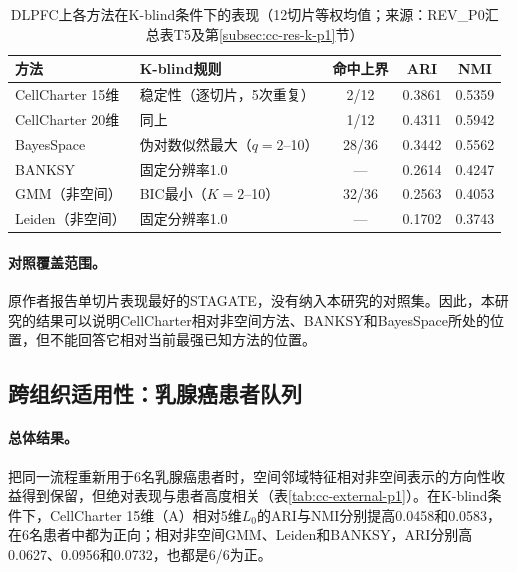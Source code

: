 \begin{table}[htbp]
\centering
\caption{DLPFC上各方法在K-blind条件下的表现（12切片等权均值；来源：REV\_P0汇总表T5及第\ref{subsec:cc-res-k-p1}节）}
\label{tab:cc-kblind-methods-p1}
\small
\begin{tabularx}{\linewidth}{lXccc}
\toprule
方法 & K-blind规则 & 命中上界 & ARI & NMI\\
\midrule
CellCharter 15维 & 稳定性（逐切片，5次重复） & 2/12 & 0.3861 & 0.5359\\
CellCharter 20维 & 同上 & 1/12 & 0.4311 & 0.5942\\
BayesSpace & 伪对数似然最大（$q=2$--10） & 28/36 & 0.3442 & 0.5562\\
BANKSY & 固定分辨率1.0 & --- & 0.2614 & 0.4247\\
GMM（非空间） & BIC最小（$K=2$--10） & 32/36 & 0.2563 & 0.4053\\
Leiden（非空间） & 固定分辨率1.0 & --- & 0.1702 & 0.3743\\
\bottomrule
\end{tabularx}
\end{table}

\paragraph{对照覆盖范围。}原作者报告单切片表现最好的STAGATE\cite{dong2022stagate}，没有纳入本研究的对照集。因此，本研究的结果可以说明CellCharter相对非空间方法、BANKSY和BayesSpace所处的位置，但不能回答它相对当前最强已知方法的位置。

\subsection{跨组织适用性：乳腺癌患者队列}
\label{subsec:cc-res-external-p1}

\paragraph{总体结果。}把同一流程重新用于6名乳腺癌患者时，空间邻域特征相对非空间表示的方向性收益得到保留，但绝对表现与患者高度相关（表\ref{tab:cc-external-p1}）。在K-blind条件下，CellCharter 15维（A）相对5维$L_0$的ARI与NMI分别提高0.0458和0.0583，在6名患者中都为正向；相对非空间GMM、Leiden和BANKSY，ARI分别高0.0627、0.0956和0.0732，也都是6/6为正。

